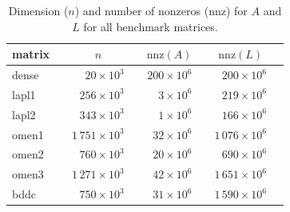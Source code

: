 \begin{table}[t]
  \centering
  \small
  \begin{tabular}{ll|rrrrrr}
  \hline
  matrix      &&  \multicolumn{1}{c}{${n}$} &&
            \multicolumn{1}{c}{${\text{nnz}(A)}$}  &&
            \multicolumn{1}{c}{${\text{nnz}(L)}$}   \\
  \hline
  dense  && $    20 \times 10^3$ && $200 \times 10^6$ &&  $  200 \times 10^6$  \\ %
  lapl1  && $   256 \times 10^3$ && $  3 \times 10^6$ &&  $  219 \times 10^6$  \\ %
  lapl2  && $   343 \times 10^3$ && $  1 \times 10^6$ &&  $  166 \times 10^6$  \\ %
  omen1  && $1\,751 \times 10^3$ && $ 32 \times 10^6$ && $1\,076 \times 10^6$  \\ %
  omen2  && $   760 \times 10^3$ && $ 20 \times 10^6$ && $   690 \times 10^6$  \\ %
  omen3  && $1\,271 \times 10^3$ && $ 42 \times 10^6$ && $1\,651 \times 10^6$  \\ %
  bddc   && $   750 \times 10^3$ && $ 31 \times 10^6$ && $1\,590 \times 10^6$  \\ %
  \hline
  \end{tabular}
  \caption{Dimension ($n$) and number of nonzeros ($\text{nnz}$) for $A$ and
$L$ for all benchmark matrices.}
  \label{tab:m:list}
\end{table}


